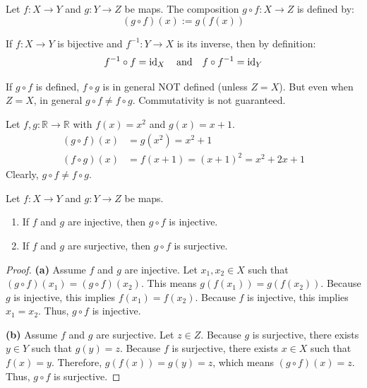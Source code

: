 \begin{definition}[Composition]
Let $f: X \to Y$ and $g: Y \to Z$ be maps. The composition $g \circ f: X \to Z$ is defined by:
\[
(g \circ f)(x) := g(f(x))
\]
\end{definition}

\begin{example}
If $f: X \to Y$ is bijective and $f^{-1}: Y \to X$ is its inverse, then by definition:
\[
f^{-1} \circ f = \operatorname{id}_X \quad \text{and} \quad f \circ f^{-1} = \operatorname{id}_Y
\]
\end{example}

\begin{remark}
If $g \circ f$ is defined, $f \circ g$ is in general NOT defined (unless $Z=X$). But even when $Z=X$, in general $g \circ f \ne f \circ g$. Commutativity is not guaranteed.
\end{remark}

\begin{example}
Let $f, g: \mathbb{R} \to \mathbb{R}$ with $f(x) = x^2$ and $g(x) = x+1$.
\begin{align*}
(g \circ f)(x) &= g(x^2) = x^2 + 1 \\
(f \circ g)(x) &= f(x+1) = (x+1)^2 = x^2 + 2x + 1
\end{align*}
Clearly, $g \circ f \ne f \circ g$.
\end{example}

\begin{lemma}
Let $f: X \to Y$ and $g: Y \to Z$ be maps.
\begin{enumerate}
    \item If $f$ and $g$ are injective, then $g \circ f$ is injective.
    \item If $f$ and $g$ are surjective, then $g \circ f$ is surjective.
\end{enumerate}
\end{lemma}

\begin{proof}
\textbf{(a)} Assume $f$ and $g$ are injective. Let $x_1, x_2 \in X$ such that $(g \circ f)(x_1) = (g \circ f)(x_2)$. This means $g(f(x_1)) = g(f(x_2))$. Because $g$ is injective, this implies $f(x_1) = f(x_2)$. Because $f$ is injective, this implies $x_1 = x_2$. Thus, $g \circ f$ is injective.

\textbf{(b)} Assume $f$ and $g$ are surjective. Let $z \in Z$. Because $g$ is surjective, there exists $y \in Y$ such that $g(y) = z$. Because $f$ is surjective, there exists $x \in X$ such that $f(x) = y$. Therefore, $g(f(x)) = g(y) = z$, which means $(g \circ f)(x) = z$. Thus, $g \circ f$ is surjective.
\end{proof}

